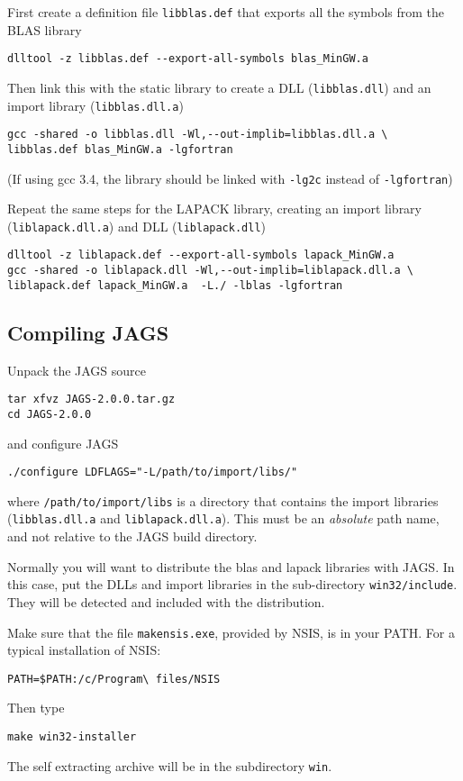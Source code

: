 \documentclass[11pt, a4paper, titlepage]{article}
\newcommand{\JAGS}{\textsf{JAGS}}
\begin{document}
First create a definition file \verb+libblas.def+ that exports all the
symbols from the BLAS library
\begin{verbatim}
dlltool -z libblas.def --export-all-symbols blas_MinGW.a
\end{verbatim}
Then link this with the static library to create a DLL
(\verb+libblas.dll+) and an import library (\verb+libblas.dll.a+)
\begin{verbatim}
gcc -shared -o libblas.dll -Wl,--out-implib=libblas.dll.a \
libblas.def blas_MinGW.a -lgfortran
\end{verbatim}
(If using gcc 3.4, the library should be linked with \verb+-lg2c+ 
instead of \verb+-lgfortran+)
 
Repeat the same steps for the LAPACK library, creating an import library
(\verb+liblapack.dll.a+) and DLL (\verb+liblapack.dll+)
\begin{verbatim}
dlltool -z liblapack.def --export-all-symbols lapack_MinGW.a
gcc -shared -o liblapack.dll -Wl,--out-implib=liblapack.dll.a \
liblapack.def lapack_MinGW.a  -L./ -lblas -lgfortran
\end{verbatim}

\subsection{Compiling \JAGS}

Unpack the JAGS source
\begin{verbatim}
tar xfvz JAGS-2.0.0.tar.gz
cd JAGS-2.0.0
\end{verbatim}
and configure JAGS
\begin{verbatim}
./configure LDFLAGS="-L/path/to/import/libs/" 
\end{verbatim}
where \verb+/path/to/import/libs+ is a directory that contains the
import libraries (\verb+libblas.dll.a+ and \verb+liblapack.dll.a+).
This must be an {\em absolute} path name, and not relative to
the JAGS build directory.

Normally you will want to distribute the blas and lapack libraries
with JAGS.  In this case, put the DLLs and import libraries in the
sub-directory \verb+win32/include+. They will be detected and included
with the distribution.

Make sure that the file \verb+makensis.exe+, provided by NSIS, is in
your PATH. For a typical installation of NSIS:
\begin{verbatim}
PATH=$PATH:/c/Program\ files/NSIS
\end{verbatim}
Then type
\begin{verbatim}
make win32-installer
\end{verbatim}
The self extracting archive will be in the subdirectory \verb+win+.
\end{document}
